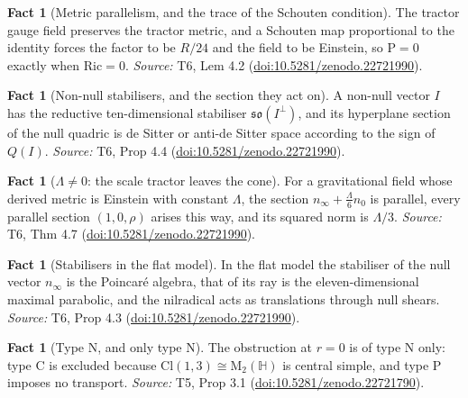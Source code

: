 \documentclass[11pt]{article}
\theoremstyle{definition}
\newtheorem{fact}[theorem]{Fact}
\theoremstyle{plain}
\providecommand{\Cl}{}\renewcommand{\Cl}{\mathrm{Cl}}
\providecommand{\HH}{}\renewcommand{\HH}{\mathbb{H}}
\providecommand{\Mat}{}\renewcommand{\Mat}{\mathrm{M}}
\providecommand{\Ric}{}\renewcommand{\Ric}{\mathrm{Ric}}
\providecommand{\Sch}{}\renewcommand{\Sch}{\mathrm{P}}
\providecommand{\nInf}{}\renewcommand{\nInf}{n_\infty}
\providecommand{\nO}{}\renewcommand{\nO}{n_0}
\begin{document}
\begin{fact}[Metric parallelism, and the trace of the Schouten condition]\label{c:interior.metric-parallelism-trace-schouten-condition}
The tractor gauge field preserves the tractor metric, and a Schouten map proportional to the identity forces the factor to be $R/24$ and the field to be Einstein, so $\Sch = 0$ exactly when $\Ric = 0$.
\emph{Source:} T6, Lem 4.2 (\href{https://doi.org/10.5281/zenodo.22721990}{doi:10.5281/zenodo.22721990}).
\end{fact}

\begin{fact}[Non-null stabilisers, and the section they act on]\label{c:interior.non-null-stabilisers-section-they-act}
A non-null vector $I$ has the reductive ten-dimensional stabiliser $\mathfrak{so}(I^\perp)$, and its hyperplane section of the null quadric is de Sitter or anti-de Sitter space according to the sign of $Q(I)$.
\emph{Source:} T6, Prop 4.4 (\href{https://doi.org/10.5281/zenodo.22721990}{doi:10.5281/zenodo.22721990}).
\end{fact}

\begin{fact}[$\Lambda \neq 0$: the scale tractor leaves the cone]\label{c:interior.scale-tractor-leaves-cone}
For a gravitational field whose derived metric is Einstein with constant $\Lambda$, the section $\nInf + \tfrac{\Lambda}{6}\nO$ is parallel, every parallel section $(1, 0, \rho)$ arises this way, and its squared norm is $\Lambda/3$.
\emph{Source:} T6, Thm 4.7 (\href{https://doi.org/10.5281/zenodo.22721990}{doi:10.5281/zenodo.22721990}).
\end{fact}

\begin{fact}[Stabilisers in the flat model]\label{c:interior.stabilisers-flat-model}
In the flat model the stabiliser of the null vector $\nInf$ is the Poincar\'e algebra, that of its ray is the eleven-dimensional maximal parabolic, and the nilradical acts as translations through null shears.
\emph{Source:} T6, Prop 4.3 (\href{https://doi.org/10.5281/zenodo.22721990}{doi:10.5281/zenodo.22721990}).
\end{fact}

\begin{fact}[Type N, and only type N]\label{c:singularity.type-n-only-type-n}
The obstruction at $r = 0$ is of type N only: type C is excluded because $\Cl(1,3) \cong \Mat_2(\HH)$ is central simple, and type P imposes no transport.
\emph{Source:} T5, Prop 3.1 (\href{https://doi.org/10.5281/zenodo.22721790}{doi:10.5281/zenodo.22721790}).
\end{fact}
\end{document}
